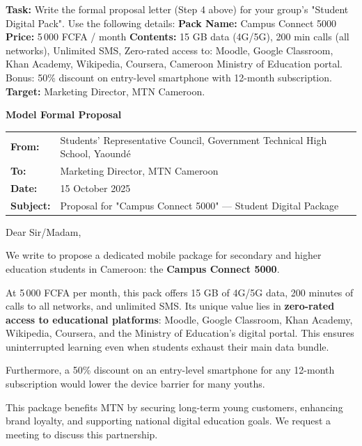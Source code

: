 \documentclass[11pt]{article}
\newcommand{\cle}[1]{{\popxbold\color{popdark}#1}}
\begin{document}
\begin{exoresolu}
\textbf{Task:} Write the formal proposal letter (Step 4 above) for your group's "Student Digital Pack". Use the following details:
\textbf{Pack Name:} \cle{Campus Connect 5000}
\textbf{Price:} 5\,000 FCFA / month
\textbf{Contents:} 15 GB data (4G/5G), 200 min calls (all networks), Unlimited SMS, Zero-rated access to: Moodle, Google Classroom, Khan Academy, Wikipedia, Coursera, Cameroon Ministry of Education portal. Bonus: 50\% discount on entry-level smartphone with 12-month subscription.
\textbf{Target:} Marketing Director, MTN Cameroon.

\tcblower
\textbf{Model Formal Proposal}

\begin{center}
\begin{tabular}{ll}
\textbf{From:} & Students' Representative Council, Government Technical High School, Yaoundé \\
\textbf{To:} & Marketing Director, MTN Cameroon \\
\textbf{Date:} & 15 October 2025 \\
\textbf{Subject:} & Proposal for "Campus Connect 5000" — Student Digital Package \\
\end{tabular}
\end{center}

\vspace{0.5cm}

Dear Sir/Madam,

We write to propose a dedicated mobile package for secondary and higher education students in Cameroon: the \textbf{Campus Connect 5000}.

At 5\,000 FCFA per month, this pack offers 15 GB of 4G/5G data, 200 minutes of calls to all networks, and unlimited SMS. Its unique value lies in \textbf{zero-rated access to educational platforms}: Moodle, Google Classroom, Khan Academy, Wikipedia, Coursera, and the Ministry of Education's digital portal. This ensures uninterrupted learning even when students exhaust their main data bundle.

Furthermore, a 50\% discount on an entry-level smartphone for any 12-month subscription would lower the device barrier for many youths.

This package benefits MTN by securing long-term young customers, enhancing brand loyalty, and supporting national digital education goals. We request a meeting to discuss this partnership.


\end{exoresolu}
\end{document}
